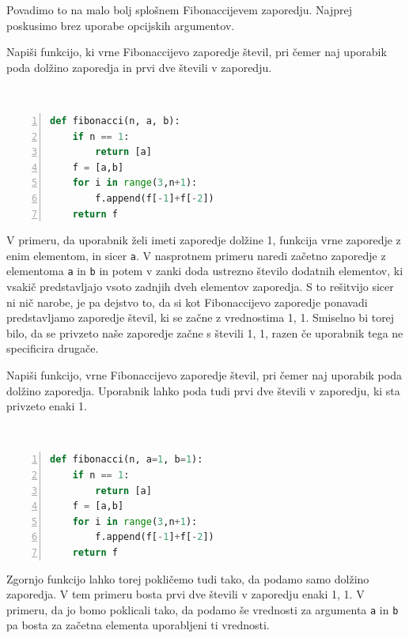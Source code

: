 Povadimo to na malo bolj splošnem Fibonaccijevem zaporedju. Najprej poskusimo brez uporabe opcijskih argumentov.
\begin{zgled}
Napiši funkcijo, ki vrne Fibonaccijevo zaporedje števil, pri čemer naj uporabik poda dolžino zaporedja in prvi dve števili v zaporedju.
\end{zgled}
\begin{resitev} \  
\begin{lstlisting}[language=Python, showstringspaces=false,numbers=left]
def fibonacci(n, a, b):
    if n == 1:
        return [a]
    f = [a,b]
    for i in range(3,n+1):
        f.append(f[-1]+f[-2])
    return f
\end{lstlisting}
\end{resitev}
V primeru, da uporabnik želi imeti zaporedje dolžine 1, funkcija vrne zaporedje z enim elementom, in sicer \texttt{a}. V nasprotnem primeru naredi začetno zaporedje z elementoma \texttt{a} in \texttt{b} in potem v zanki doda ustrezno število dodatnih elementov, ki vsakič predstavljajo vsoto zadnjih dveh elementov zaporedja. S to rešitvijo sicer ni nič narobe, je pa dejstvo to, da si kot Fibonaccijevo zaporedje ponavadi predstavljamo zaporedje števil, ki se začne z vrednostima 1, 1. Smiselno bi torej bilo, da se privzeto naše zaporedje začne s števili 1, 1, razen če uporabnik tega ne specificira drugače. 
\begin{zgled}
Napiši funkcijo, vrne Fibonaccijevo zaporedje števil, pri čemer naj uporabik poda dolžino zaporedja. Uporabnik lahko poda tudi prvi dve števili v zaporedju, ki sta privzeto enaki 1.
\end{zgled}
\begin{resitev} \  
\begin{lstlisting}[language=Python, showstringspaces=false,numbers=left]
def fibonacci(n, a=1, b=1):
    if n == 1:
        return [a]
    f = [a,b]
    for i in range(3,n+1):
        f.append(f[-1]+f[-2])
    return f
\end{lstlisting}
\end{resitev}
Zgornjo funkcijo lahko torej pokličemo tudi tako, da podamo samo dolžino zaporedja. V tem primeru bosta prvi dve števili v zaporedju enaki 1, 1. V primeru, da jo bomo poklicali tako, da podamo še vrednosti za argumenta \texttt{a} in \texttt{b} pa bosta za začetna elementa uporabljeni ti vrednosti.
